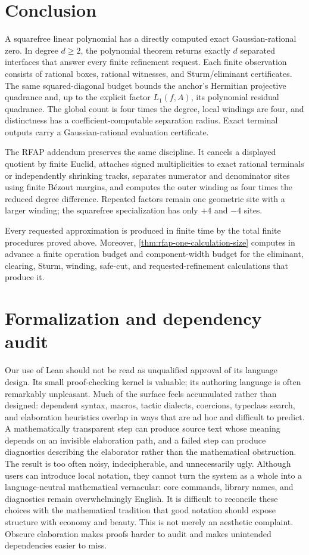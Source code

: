 \documentclass[11pt]{article}
\begin{document}
\section{Conclusion}

A squarefree linear polynomial has a directly computed exact
Gaussian-rational zero.  In degree $d\ge2$, the polynomial theorem returns
exactly $d$ separated interfaces that answer every finite refinement request.
Each finite observation consists of rational boxes, rational witnesses, and
Sturm/eliminant certificates.  The same
squared-diagonal budget bounds the anchor's Hermitian projective quadrance
and, up to the
explicit factor $L_1(f,A)$, its polynomial residual quadrance.  The global
count is four times the degree, local windings are four, and distinctness has a
coefficient-computable separation radius.  Exact terminal outputs carry a
Gaussian-rational evaluation certificate.

The RFAP addendum preserves the same discipline.  It cancels a displayed
quotient by finite Euclid, attaches signed multiplicities to exact rational
terminals or independently shrinking tracks, separates numerator and
denominator sites using finite B\'ezout margins, and computes the outer
winding as four times the reduced degree difference.  Repeated factors remain
one geometric site with a larger winding; the squarefree specialization has
only $+4$ and $-4$ sites.

Every requested approximation is produced in finite time by the total
finite procedures proved above.  Moreover,
\cref{thm:rfap-one-calculation-size} computes in advance a finite operation
budget and component-width budget for the eliminant, clearing, Sturm,
winding, safe-cut, and requested-refinement calculations that produce it.

\appendix
\section{Formalization and dependency audit}
\label{sec:formalization-audit}

Our use of Lean should not be read as unqualified approval of its language
design.  Its small proof-checking kernel is valuable; its authoring language
is often remarkably unpleasant.  Much of the surface feels accumulated
rather than designed: dependent syntax, macros, tactic dialects, coercions,
typeclass search, and elaboration heuristics overlap in ways that are ad hoc
and difficult to predict.  A mathematically transparent step can produce
source text whose meaning depends on an invisible elaboration path, and a
failed step can produce diagnostics describing the elaborator rather than
the mathematical obstruction.  The result is too often noisy,
indecipherable, and unnecessarily ugly.  Although users can introduce local
notation, they cannot turn the system as a whole into a language-neutral
mathematical vernacular: core commands, library names, and diagnostics remain
overwhelmingly English.  It is difficult to reconcile these choices with the
mathematical tradition that good notation should expose structure with
economy and beauty.  This is not merely an aesthetic complaint.  Obscure
elaboration makes proofs harder to audit and makes unintended dependencies
easier to miss.
\end{document}
